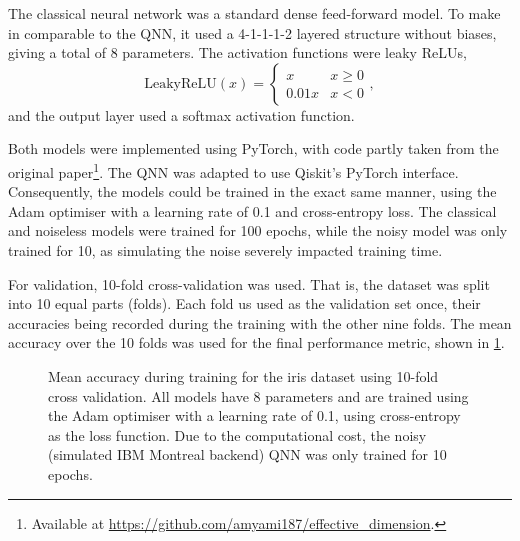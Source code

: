 The classical neural network was a standard dense feed-forward model.
To make in comparable to the QNN, it used a 4-1-1-1-2 layered structure without biases, giving a total of 8 parameters.
The activation functions were leaky ReLUs,
\begin{equation}
    \text{LeakyReLU}(x) = \begin{cases}
        x     & x \geq 0 \\
        0.01x & x < 0
    \end{cases},
\end{equation}
and the output layer used a softmax activation function.

Both models were implemented using PyTorch, with code partly taken from the original paper\footnote{Available at \url{https://github.com/amyami187/effective_dimension}.}.
The QNN was adapted to use Qiskit's PyTorch interface.
Consequently, the models could be trained in the exact same manner, using the Adam optimiser with a learning rate of 0.1 and cross-entropy loss.
The classical and noiseless models were trained for 100 epochs, while the noisy model was only trained for 10, as simulating the noise severely impacted training time.

For validation, 10-fold cross-validation was used.
That is, the dataset was split into 10 equal parts (folds).
Each fold us used as the validation set once, their accuracies being recorded during the training with the other nine folds.
The mean accuracy over the 10 folds was used for the final performance metric, shown in \cref{fig:iris_training}.

\begin{figure}
    \centering
    \caption{
        Mean accuracy during training for the iris dataset using 10-fold cross validation.
        All models have 8 parameters and are trained using the Adam optimiser with a learning rate of 0.1, using cross-entropy as the loss function.
        Due to the computational cost, the noisy (simulated IBM Montreal backend) QNN was only trained for 10 epochs.
    }
    \label{fig:iris_training}
\end{figure}


